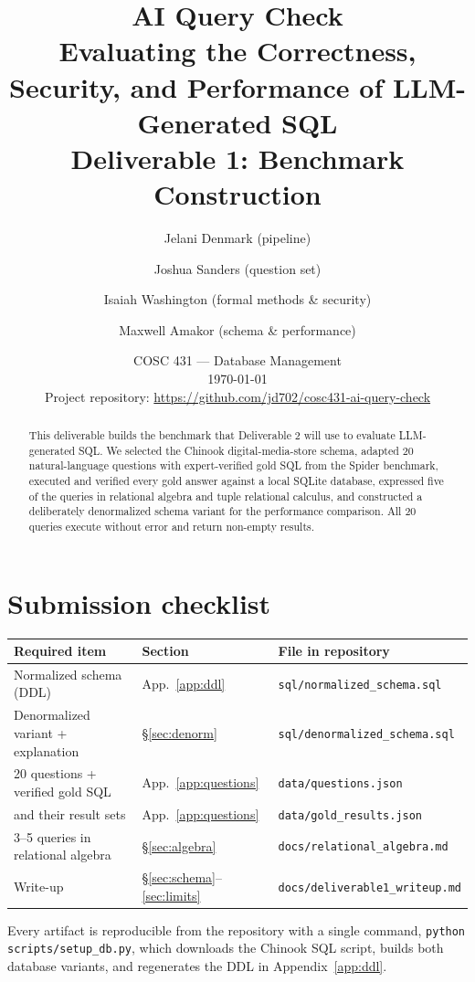\documentclass[11pt]{article}
\title{\textbf{AI Query Check}\\[0.3em]
\large Evaluating the Correctness, Security, and Performance of LLM-Generated SQL\\[0.6em]
\normalsize Deliverable 1: Benchmark Construction}
\author{%
Jelani Denmark (pipeline) \and
Joshua Sanders (question set) \and
Isaiah Washington (formal methods \& security) \and
Maxwell Amakor (schema \& performance)%
}
\date{COSC 431 --- Database Management \\ \today \\[0.8em]
\normalsize Project repository: \url{https://github.com/jd702/cosc431-ai-query-check}}
\begin{document}
\maketitle

\begin{abstract}
\noindent
This deliverable builds the benchmark that Deliverable 2 will use to evaluate LLM-generated SQL.
We selected the Chinook digital-media-store schema, adapted 20 natural-language questions with
expert-verified gold SQL from the Spider benchmark, executed and verified every gold answer
against a local SQLite database, expressed five of the queries in relational algebra and tuple
relational calculus, and constructed a deliberately denormalized schema variant for the
performance comparison. All 20 queries execute without error and return non-empty results.
\end{abstract}

\section{Submission checklist}

\begin{center}
\begin{tabular}{@{}llp{6.1cm}@{}}
\toprule
\textbf{Required item} & \textbf{Section} & \textbf{File in repository} \\
\midrule
Normalized schema (DDL)            & App.~\ref{app:ddl} & \texttt{sql/normalized\_schema.sql} \\
Denormalized variant + explanation & \S\ref{sec:denorm} & \texttt{sql/denormalized\_schema.sql} \\
20 questions + verified gold SQL   & App.~\ref{app:questions} & \texttt{data/questions.json} \\
\quad and their result sets        & App.~\ref{app:questions} & \texttt{data/gold\_results.json} \\
3--5 queries in relational algebra & \S\ref{sec:algebra} & \texttt{docs/relational\_algebra.md} \\
Write-up                           & \S\ref{sec:schema}--\ref{sec:limits} & \texttt{docs/deliverable1\_writeup.md} \\
\bottomrule
\end{tabular}
\end{center}

\noindent
Every artifact is reproducible from the repository with a single command,
\texttt{python scripts/setup\_db.py}, which downloads the Chinook SQL script, builds both
database variants, and regenerates the DDL in Appendix~\ref{app:ddl}.
\end{document}

